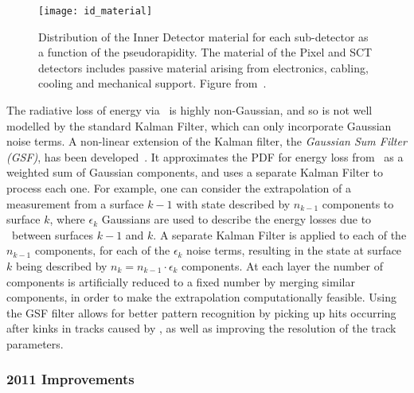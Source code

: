 \begin{figure}[h]
\centering
            \texttt{[image: id\_material]}
\caption{
Distribution of the Inner Detector material for each sub-detector as a
function of the pseudorapidity. The material of the Pixel and SCT detectors
includes passive material arising from electronics, cabling, cooling and
mechanical support. Figure from~\cite{ATLAS-CONF-2012-047}.}
\label{fig:id-material}
\end{figure}


The radiative loss of energy via \brem\ is highly non-Gaussian, and so is not
well modelled by the standard Kalman Filter, which can only incorporate Gaussian
noise terms. A non-linear extension of the
Kalman filter, the {\it Gaussian Sum Filter (GSF)}, has been
developed~\cite{Fruhwirth2003131,Atkinson:1448253}. It
approximates the PDF for energy loss from \brem\ as a weighted sum of Gaussian
components, and uses a separate Kalman Filter to process each one. For example,
one can consider the extrapolation of a measurement from a surface $k-1$ with state
described by $n_{k-1}$ components to surface $k$, where $\epsilon_{k}$ Gaussians
are used to describe the energy losses due to \brem\ between surfaces $k-1$ and
$k$. A separate Kalman Filter is applied to each of the $n_{k-1}$
components, for each of the $\epsilon_{k}$ noise terms, resulting in the state at
surface $k$ being described by $n_{k} = n_{k-1} \cdot \epsilon_{k}$ components.
At each layer the number of components is artificially reduced to a fixed number
by merging similar components,
in order to make the extrapolation computationally feasible.
Using the GSF filter allows for better pattern recognition by picking up hits
occurring after kinks in tracks caused by \brem, as well as improving the
resolution of the track parameters.

\subsubsection{2011 Improvements}


